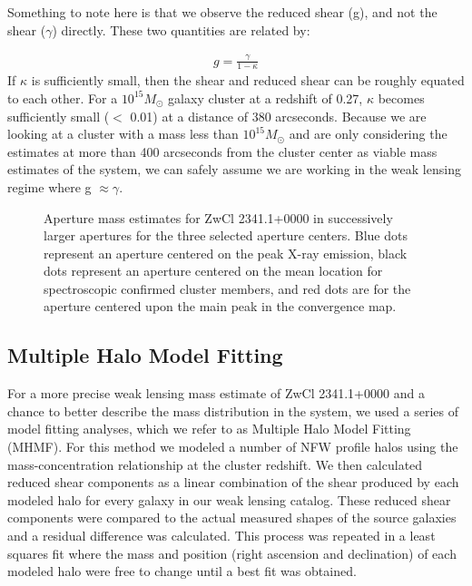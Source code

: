 \documentclass[onecolumn]{aastex}
\begin{document}
Something to note here is that we observe the reduced shear (g), and not the shear ($\gamma$) directly.  These two quantities are related by:

\begin{align}
g = \frac{\gamma}{1-\kappa}
\end{align}
If $\kappa$ is sufficiently small, then the shear and reduced shear can be roughly equated to each other.  For a $10^{15} M_{\odot}$ galaxy cluster at a redshift of 0.27, $\kappa$ becomes sufficiently small ($<$ 0.01) at a distance of 380 arcseconds.  Because we are looking at a cluster with a mass less than $10^{15} M_{\odot}$ and are only considering the estimates at more than 400 arcseconds from the cluster center as viable mass estimates of the system, we can safely assume we are working in the weak lensing regime where g $\approx \gamma$.

\begin{figure}  
\caption{Aperture mass estimates for ZwCl 2341.1+0000 in successively larger apertures for the three selected aperture centers.  Blue dots represent an aperture centered on the peak X-ray emission, black dots represent an aperture centered on the mean location for spectroscopic confirmed cluster members, and red dots are for the aperture centered upon the main peak in the convergence map.\label{fig12}} 
\end{figure}

\subsection{Multiple Halo Model Fitting}
For a more precise weak lensing mass estimate of ZwCl 2341.1+0000 and a chance to better describe the mass distribution in the system, we used a series of model fitting analyses, which we refer to as Multiple Halo Model Fitting (MHMF).  For this method we modeled a number of NFW profile halos using the \cite{Duffy08} mass-concentration relationship at the cluster redshift.  We then calculated reduced shear components as a linear combination of the shear produced by each modeled halo for every galaxy in our weak lensing catalog.  These reduced shear components were compared to the actual measured shapes of the source galaxies and a residual difference was calculated.  This process was repeated in a least squares fit where the mass and position (right ascension and declination) of each modeled halo were free to change until a best fit was obtained.  
\end{document}
